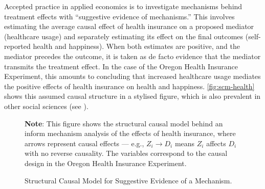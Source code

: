 Accepted practice in applied economics is to investigate mechanisms behind treatment effects with ``suggestive evidence of mechanisms.''
This involves estimating the average causal effect of health insurance on a proposed mediator (healthcare usage) and separately estimating its effect on the final outcomes (self-reported health and happiness).
When both estimates are positive, and the mediator precedes the outcome, it is taken as de facto evidence that the mediator transmits the treatment effect.
In the case of the Oregon Health Insurance Experiment, this amounts to concluding that increased healthcare usage mediates the positive effects of health insurance on health and happiness.
\autoref{fig:scm-health} shows this assumed causal structure in a stylised figure, which is also prevalent in other social sciences (see \citealt{blackwell2024assumption}).

\begin{figure}[!htbp]
    \centering
    \singlespacing
    \caption{Structural Causal Model for Suggestive Evidence of a Mechanism.}
    \label{fig:scm-health}
    \justify
    \footnotesize
    \textbf{Note}:
    This figure shows the structural causal model behind an inform mechanism analysis of the effects of health insurance, where arrows represent causal effects --- e.g., $Z_i \to D_i$ means $Z_i$ affects $D_i$ with no reverse causality.
    The variables correspond to the causal design in the Oregon Health Insurance Experiment.
\end{figure}

